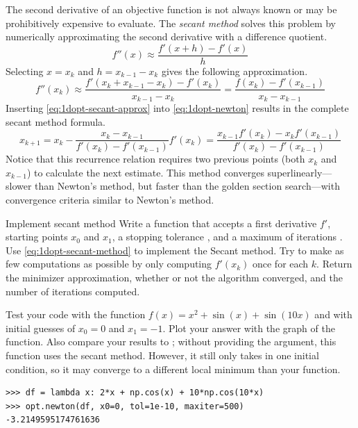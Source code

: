 The second derivative of an objective function is not always known or may be prohibitively expensive to evaluate.
The \emph{secant method} solves this problem by numerically approximating the second derivative with a difference quotient.
\[
f''(x) \approx \frac{f'(x + h) - f'(x)}{h}
\]
Selecting $x = x_k$ and $h = x_{k-1} - x_k$ gives the following approximation.
\begin{equation}
f''(x_k) \approx \frac{f'(x_k + x_{k-1} - x_k) - f'(x_k)}{x_{k-1} - x_k}
= \frac{f(x_k) - f'(x_{k-1})}{x_k - x_{k-1}}
\label{eq:1dopt-secant-approx}
\end{equation}
Inserting \eqref{eq:1dopt-secant-approx} into \eqref{eq:1dopt-newton} results in the complete secant method formula.
\begin{equation}
x_{k+1}
= x_k - \frac{x_k - x_{k-1}}{f'(x_k) - f'(x_{k-1})}f'(x_k)
= \frac{x_{k-1}f'(x_k) - x_{k}f'(x_{k-1})}{f'(x_k) - f'(x_{k-1})}
\label{eq:1dopt-secant-method}
\end{equation}
Notice that this recurrence relation requires two previous points (both $x_{k}$ and $x_{k-1}$) to calculate the next estimate.
This method converges superlinearly---slower than Newton's method, but faster than the golden section search---with convergence criteria similar to Newton's method.

\begin{problem}{Implement secant method}{}
Write a function that accepts a first derivative $f'$, starting points $x_0$ and $x_1$, a stopping tolerance , and a maximum of iterations .
Use \eqref{eq:1dopt-secant-method} to implement the Secant method.
Try to make as few computations as possible by only computing $f'(x_k)$ once for each $k$.
Return the minimizer approximation, whether or not the algorithm converged, and the number of iterations computed.

Test your code with the function $f(x) = x^2 + \sin(x) + \sin(10x)$ and with initial guesses of $x_0 = 0$ and $x_1 = -1$.
Plot your answer with the graph of the function.
Also compare your results to ; without providing the  argument, this function uses the secant method.
However, it still only takes in one initial condition, so it may converge to a different local minimum than your function.

\begin{lstlisting}
>>> df = lambda x: 2*x + np.cos(x) + 10*np.cos(10*x)
>>> opt.newton(df, x0=0, tol=1e-10, maxiter=500)
-3.2149595174761636
\end{lstlisting}
\end{problem}

